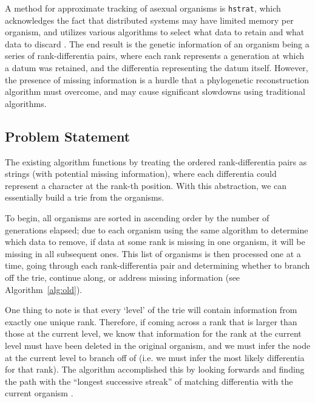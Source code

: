 A method for approximate tracking of asexual organisms is \texttt{hstrat}, which acknowledges the fact that distributed systems may have limited memory per organism, and utilizes various algorithms to select what data to retain and what data to discard \citep{moreno2022hstrat}. The end result is the genetic information of an organism being a series of rank-differentia pairs, where each rank represents a generation at which a datum was retained, and the differentia representing the datum itself. However, the presence of missing information is a hurdle that a phylogenetic reconstruction algorithm must overcome, and may cause significant slowdowns using traditional algorithms.

\subsection{Problem Statement} \label{sec:introduction:problem}

The existing algorithm functions by treating the ordered rank-differentia pairs as strings (with potential missing information), where each differentia could represent a character at the rank-th position. With this abstraction, we can essentially build a trie \citep{fredkin1960trie} from the organisms. 

To begin, all organisms are sorted in ascending order by the number of generations elapsed; due to each organism using the same algorithm to determine which data to remove, if data at some rank is missing in one organism, it will be missing in all subsequent ones. This list of organisms is then processed one at a time, going through each rank-differentia pair and determining whether to branch off the trie, continue along, or address missing information (see Algorithm~\ref{alg:old}). 

One thing to note is that every `level' of the trie will contain information from exactly one unique rank. Therefore, if coming across a rank that is larger than those at the current level, we know that information for the rank at the current level must have been deleted in the original organism, and we must infer the node at the current level to branch off of (i.e. we must infer the most likely differentia for that rank). The algorithm accomplished this by looking forwards and finding the path with the ``longest successive streak'' of matching differentia with the current organism \citep{moreno2024analysis}.

